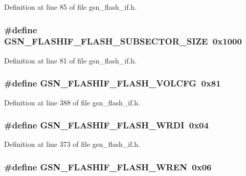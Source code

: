 Definition at line 85 of file gsn\_\-flash\_\-if.h.

\hypertarget{a00501_a3a6d61a1bfa4bbe3f67b3932cf5a2f43}{
\subsubsection[{GSN\_\-FLASHIF\_\-FLASH\_\-SUBSECTOR\_\-SIZE}]{\setlength{\rightskip}{0pt plus 5cm}\#define GSN\_\-FLASHIF\_\-FLASH\_\-SUBSECTOR\_\-SIZE~0x1000}}
\label{a00501_a3a6d61a1bfa4bbe3f67b3932cf5a2f43}


Definition at line 81 of file gsn\_\-flash\_\-if.h.

\hypertarget{a00501_aab2968a7a313ab5fb8eb33a9819e90ea}{
\subsubsection[{GSN\_\-FLASHIF\_\-FLASH\_\-VOLCFG}]{\setlength{\rightskip}{0pt plus 5cm}\#define GSN\_\-FLASHIF\_\-FLASH\_\-VOLCFG~0x81}}
\label{a00501_aab2968a7a313ab5fb8eb33a9819e90ea}


Definition at line 388 of file gsn\_\-flash\_\-if.h.

\hypertarget{a00501_ad413125ceeb0878fad9e5436ef6d515e}{
\subsubsection[{GSN\_\-FLASHIF\_\-FLASH\_\-WRDI}]{\setlength{\rightskip}{0pt plus 5cm}\#define GSN\_\-FLASHIF\_\-FLASH\_\-WRDI~0x04}}
\label{a00501_ad413125ceeb0878fad9e5436ef6d515e}


Definition at line 373 of file gsn\_\-flash\_\-if.h.

\hypertarget{a00501_a34322cbcb7fccb290f6f66cfae69df35}{
\subsubsection[{GSN\_\-FLASHIF\_\-FLASH\_\-WREN}]{\setlength{\rightskip}{0pt plus 5cm}\#define GSN\_\-FLASHIF\_\-FLASH\_\-WREN~0x06}}
\label{a00501_a34322cbcb7fccb290f6f66cfae69df35}


